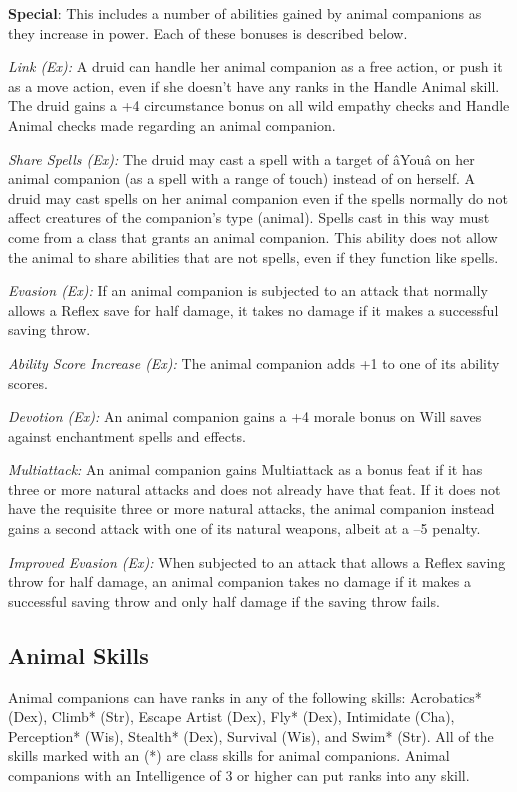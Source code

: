 \textbf{Special}: This includes a number of abilities gained by animal companions as they increase in power. Each of these bonuses is described below.
				
\textit{Link (Ex):} A druid can handle her animal companion as a free action, or push it as a move action, even if she doesn't have any ranks in the Handle Animal skill. The druid gains a +4 circumstance bonus on all wild empathy checks and Handle Animal checks made regarding an animal companion.
				
\textit{Share Spells (Ex):} The druid may cast a spell with a target of \^aYou\^a on her animal companion (as a spell with a range of touch) instead of on herself. A druid may cast spells on her animal companion even if the spells normally do not affect creatures of the companion's type (animal). Spells cast in this way must come from a class that grants an animal companion. This ability does not allow the animal to share abilities that are not spells, even if they function like spells.
				
\textit{Evasion (Ex):} If an animal companion is subjected to an attack that normally allows a Reflex save for half damage, it takes no damage if it makes a successful saving throw.
				
\textit{Ability Score Increase (Ex):} The animal companion adds +1 to one of its ability scores.
				
\textit{Devotion (Ex):} An animal companion gains a +4 morale bonus on Will saves against enchantment spells and effects.
				
\textit{Multiattack: }An animal companion gains Multiattack as a bonus feat if it has three or more natural attacks and does not already have that feat. If it does not have the requisite three or more natural attacks, the animal companion instead gains a second attack with one of its natural weapons, albeit at a --5 penalty.
				
\textit{Improved Evasion (Ex):} When subjected to an attack that allows a Reflex saving throw for half damage, an animal companion takes no damage if it makes a successful saving throw and only half damage if the saving throw fails.
				
\subsection{Animal Skills}

				
Animal companions can have ranks in any of the following skills: Acrobatics* (Dex), Climb* (Str), Escape Artist (Dex), Fly* (Dex), Intimidate (Cha), Perception* (Wis), Stealth* (Dex), Survival (Wis), and Swim* (Str). All of the skills marked with an (*) are class skills for animal companions. Animal companions with an Intelligence of 3 or higher can put ranks into any skill. 
				
